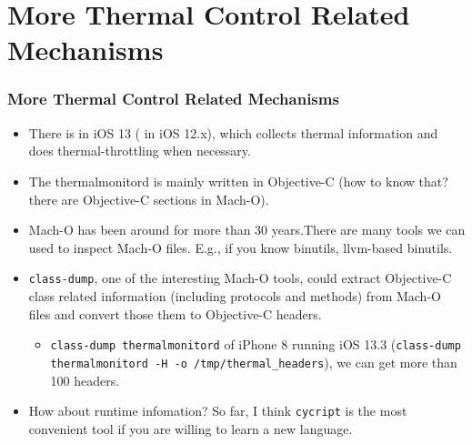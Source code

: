 \documentclass{beamer}
\begin{document}
\section{More Thermal Control Related Mechanisms}
\begin{frame}[allowframebreaks]
  \frametitle{More Thermal Control Related Mechanisms}
  \begin{itemize}
  \item There is  in iOS 13 ( in iOS 12.x), which collects thermal information and does thermal-throttling when necessary.
  \item The thermalmonitord is mainly written in Objective-C (how to know that? there are Objective-C sections in Mach-O).
  \item Mach-O has been around for more than 30 years.There are many tools we can used to inspect Mach-O files. E.g., if you know binutils, llvm-based binutils.
  \item \texttt{class-dump}, one of the interesting Mach-O tools, could extract Objective-C class related information (including protocols and methods) from Mach-O files and convert those them to Objective-C headers.
    \begin{itemize}
    \item \texttt{class-dump thermalmonitord} of iPhone 8 running iOS 13.3 (\texttt{class-dump thermalmonitord -H -o /tmp/thermal\_headers}), we can get more than 100 headers.
    \end{itemize}
  \item How about runtime infomation? So far, I think \texttt{cycript} \cite{cycript} is the most convenient tool if you are willing to learn a new language.
  \end{itemize}
\end{frame}
\end{document}
